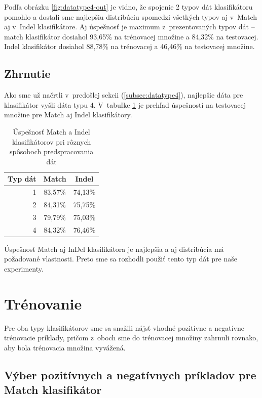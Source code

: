 Podľa obrázku \ref{fig:datatype4-out} je vidno, že spojenie 2 typov dát klasifikátoru pomohlo a dostali sme najlepšiu distribúciu spomedzi všetkých typov aj v~Match aj v~Indel klasifikátore.
Aj úspešnosť je maximum z~prezentovaných typov dát -- match klasifikátor dosiahol 93,65\% na trénovacej množine a 84,32\% na testovacej.
Indel klasifikátor dosiahol 88,78\% na trénovacej a 46,46\% na testovacej množine.

\subsection{Zhrnutie}

Ako sme už načrtli v~predošlej sekcii (\ref{subsec:datatype4}), najlepšie dáta pre klasifikátor vyšli dáta typu 4.
V~tabuľke \ref{tab:datatype-all} je prehľad úspešností na testovacej množine pre Match aj Indel klasifikátory.

\begin{table}[htp]
\centering
\begin{tabular}{r|cc}
Typ dát & Match & Indel\\
\hline
1 & 83,57\% & 74,13\%\\
2 & 84,31\% & 75,75\%\\
3 & 79,79\% & 75,03\%\\
4 & 84,32\% & 76,46\%\\
\end{tabular}
\caption[Úspešnosť klasifikátorov pri rôznych typoch dát]{Úspešnosť Match a Indel klasifikátorov pri rôznych spôsoboch predspracovania dát}
\label{tab:datatype-all}
\end{table}

Úspešnosť Match aj InDel klasifikátora je najlepšia a aj distribúcia má požadované vlastnosti. Preto sme sa rozhodli použiť tento typ dát pre naše experimenty.

\section{Trénovanie}

Pre oba typy klasifikátorov sme sa snažili nájsť vhodné pozitívne a negatívne trénovacie príklady, pričom z~oboch sme do trénovacej množiny zahrnuli rovnako, aby bola trénovacia množina vyvážená.

\subsection{Výber pozitívnych a negatívnych príkladov pre Match klasifikátor}
\label{subsec:matchtraining}

